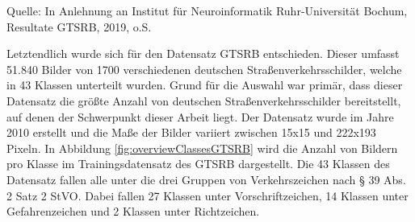 \begin{table}[t]
    
    \caption{Übersicht der fünf Einreichungen mit der höchsten Genauigkeit bei der Klassifizierung auf den GTSRB Datensatz)\label{table:TopGTRSBPaper}}
    
    \hfill \break
    Quelle: In Anlehnung an Institut für Neuroinformatik Ruhr-Universität Bochum, Resultate GTSRB, 2019, o.S.
\end{table} 
Letztendlich wurde sich für den Datensatz \ac{GTSRB} entschieden. Dieser umfasst 51.840 Bilder von 1700 verschiedenen deutschen Straßenverkehrsschilder, welche in 43 Klassen unterteilt wurden. Grund für die Auswahl war primär, dass dieser Datensatz die größte Anzahl von deutschen Straßenverkehrsschilder bereitstellt, auf denen  der Schwerpunkt dieser Arbeit liegt. Der Datensatz wurde im Jahre 2010 erstellt und die Maße der Bilder variiert zwischen 15x15 und 222x193 Pixeln. In Abbildung \ref{fig:overviewClassesGTSRB} wird die Anzahl von Bildern pro Klasse im Trainingsdatensatz des \ac{GTSRB} dargestellt. Die 43 Klassen des Datensatz fallen alle unter die drei Gruppen von Verkehrszeichen nach § 39 Abs. 2 Satz 2 \ac{StVO}. Dabei fallen 27 Klassen unter Vorschriftzeichen, 14 Klassen unter Gefahrenzeichen und 2 Klassen unter Richtzeichen. 

